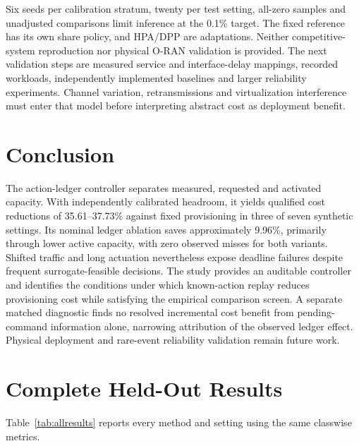\documentclass{IEEEoj}
\begin{document}
Six seeds per calibration stratum, twenty per test setting, all-zero samples
and unadjusted comparisons limit inference at the 0.1\% target. The fixed
reference has its own share policy, and HPA/DPP are adaptations. Neither
competitive-system reproduction nor physical O-RAN validation is provided.
The next validation steps are measured service and interface-delay mappings,
recorded workloads, independently implemented baselines and larger reliability
experiments. Channel variation, retransmissions and virtualization interference
must enter that model before interpreting abstract cost as deployment benefit.

\section{Conclusion}
The action-ledger controller separates measured, requested and activated
capacity. With independently calibrated headroom, it yields qualified cost
reductions of 35.61--37.73\% against fixed provisioning in three of seven
synthetic settings. Its nominal ledger ablation saves approximately 9.96\%,
primarily through lower active capacity, with zero observed misses for both
variants. Shifted traffic and long actuation nevertheless expose deadline
failures despite frequent surrogate-feasible decisions. The study provides an auditable controller and identifies the conditions under which known-action replay reduces provisioning cost while satisfying the empirical comparison screen. A separate matched diagnostic finds no resolved incremental cost benefit from pending-command information alone, narrowing attribution of the observed ledger effect. Physical deployment and rare-event reliability validation remain future work.

\clearpage
\onecolumn
\appendices
\section{Complete Held-Out Results}
Table~\ref{tab:allresults} reports every method and setting using the same classwise metrics.
\end{document}
